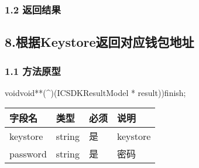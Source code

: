 \documentclass[letterpaper,10pt,english]{sphinxmanual}
\begin{document}
\subsubsection{1.2 返回结果}
\label{\detokenize{BCBWalletSDK_u63a5_u53e3_u8bf4_u660e:id106}}

\begin{sphinxVerbatim}[commandchars=\\\{\}]
     
     
\end{sphinxVerbatim}


\begin{sphinxVerbatim}[commandchars=\\\{\}]
     
\end{sphinxVerbatim}


\subsection{8.根据Keystore返回对应钱包地址}
\label{\detokenize{BCBWalletSDK_u63a5_u53e3_u8bf4_u660e:id107}}

\subsubsection{1.1 方法原型}
\label{\detokenize{BCBWalletSDK_u63a5_u53e3_u8bf4_u660e:id108}}
\sphinxstylestrong{-(}voidvoid**(\textasciicircum{})(ICSDKResultModel
* result))finish;



\begin{savenotes}\sphinxattablestart
\centering
\begin{tabulary}{\linewidth}[t]{|T|T|T|T|}
\hline
\sphinxstyletheadfamily 
字段名
&\sphinxstyletheadfamily 
类型
&\sphinxstyletheadfamily 
必须
&\sphinxstyletheadfamily 
说明
\\
\hline
keystore
&
string
&
是
&
keystore
\\
\hline
password
&
string
&
是
&
密码
\\
\hline
\end{tabulary}
\par
\sphinxattableend\end{savenotes}
\end{document}
